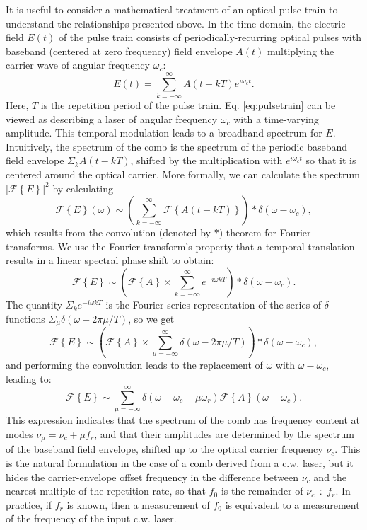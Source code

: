 It is useful to consider a mathematical treatment of an optical pulse train to understand the relationships presented above. In the time domain, the electric field $E(t)$ of the pulse train consists of periodically-recurring optical pulses with baseband (centered at zero frequency) field envelope $A(t)$ multiplying the carrier wave of angular frequency $\omega_c$:
\begin{equation}
E(t)=\sum_{k=-\infty}^{\infty} A(t-kT)e^{i\omega_c t}. \label{eq:pulsetrain}
\end{equation}
Here, $T$ is the repetition period of the pulse train. Eq. \ref{eq:pulsetrain} can be viewed as describing a laser of angular frequency $\omega_c$ with a time-varying amplitude. This temporal modulation leads to a \color{red}broadband \color{black} spectrum for $E$. Intuitively, the spectrum of the comb is the spectrum of the periodic baseband field envelope $\Sigma_k A(t-kT)$, shifted by the multiplication with $e^{i\omega_c t}$ so that it is centered around the optical carrier. More formally, we can calculate the spectrum $|\mathcal{F}\left\{E\right\}|^2$ by calculating
\begin{equation}
\mathcal{F}\left\{E\right\}(\omega)\sim\left(\sum_{k=-\infty}^{\infty}\mathcal{F}\left\{A(t-kT)\right\}\right)*\delta(\omega-\omega_c),
\end{equation}
which results from the convolution (denoted by $*$) theorem for Fourier transforms. We use the Fourier transform's property that a temporal translation results in a linear spectral phase shift to obtain:
\begin{equation}
\mathcal{F}\left\{E\right\}\sim\left(\mathcal{F}\left\{A\right\}\times\sum_{k=-\infty}^{\infty}e^{-i\omega kT}\right)*\delta(\omega-\omega_c).
\end{equation}
The quantity $\Sigma_ke^{-i\omega kT}$ is the Fourier-series representation of the series of $\delta$-functions \mbox{$\Sigma_\mu\delta(\omega-2\pi\mu/T)$}, so we get
\begin{equation}
\mathcal{F}\left\{E\right\}\sim\left(\mathcal{F}\left\{A\right\}\times\sum_{\mu=-\infty}^{\infty}\delta\left(\omega-2\pi \mu/T\right)\right)*\delta(\omega-\omega_c),
\end{equation}
and performing the convolution leads to the replacement of $\omega$ with $\omega-\omega_c$, leading to:
\begin{equation}
\mathcal{F}\left\{E\right\}\sim\sum_{\mu=-\infty}^{\infty}\delta\left(\omega-\omega_c-\mu\omega_r\right)\mathcal{F}\left\{A\right\}(\omega-\omega_c). \label{eq:combspectrum}
\end{equation}
This expression indicates that the spectrum of the comb has frequency content at modes $\nu_\mu=\nu_c+\mu f_r$, and that their amplitudes are determined by the spectrum of the baseband field envelope, shifted up to the optical carrier frequency $\nu_c$. This is the natural formulation in the case of a comb derived from a c.w. laser, but it hides the carrier-envelope offset frequency in the difference between $\nu_c$ and the nearest multiple of the repetition rate, so that $f_0$ is the remainder of $\nu_c\div f_r$. In practice, if $f_r$ is known, then a measurement of $f_0$ is equivalent to a measurement of the frequency of the input c.w. laser.


